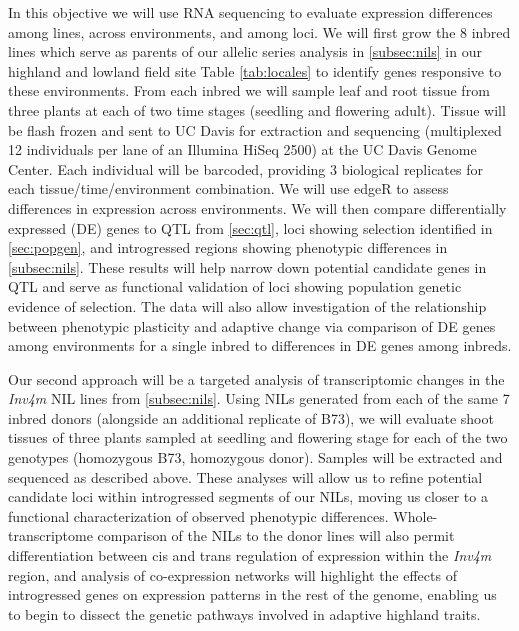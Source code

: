 In this objective we will use RNA sequencing to evaluate expression differences among lines, across environments, and among loci.  We will first grow the 8 inbred lines which serve as parents of our allelic series analysis in \ref{subsec:nils} in our highland and lowland field site Table \ref{tab:locales}  to identify genes responsive to these environments.  From each inbred we will sample leaf and root tissue from three plants at each of two time stages (seedling and flowering adult). Tissue will be flash frozen and sent to UC Davis for extraction and sequencing (multiplexed 12 individuals per lane of an Illumina HiSeq 2500) at the UC Davis Genome Center. Each individual will be barcoded, providing 3 biological replicates for each tissue/time/environment combination. We will use edgeR \citep{robinson2010edger} to assess differences in expression across environments.  We will then compare  differentially expressed (DE) genes to QTL from \ref{sec:qtl}, loci showing selection identified in \ref{sec:popgen}, and introgressed regions showing phenotypic differences in \ref{subsec:nils}.   These results will help narrow down potential candidate genes in QTL and serve as functional validation of loci showing population genetic evidence of selection.  The data will also allow investigation of the relationship between phenotypic plasticity and adaptive change \citep[c.f.][]{Rosas26082013} via comparison of DE genes among environments for a single inbred to differences in DE genes among inbreds.  

Our second approach will be a targeted analysis of transcriptomic changes in the \emph{Inv4m} NIL lines from \ref{subsec:nils}.  Using NILs generated from each of the same 7 inbred donors (alongside an additional replicate of B73), we will evaluate shoot tissues of three plants sampled at seedling and flowering stage for each of the two genotypes (homozygous B73, homozygous donor).  Samples will be extracted and sequenced as described above. These analyses will allow us to refine potential candidate loci within introgressed segments of our NILs, moving us closer to a functional characterization of observed phenotypic differences. Whole-transcriptome comparison of the NILs to the donor lines will also permit differentiation between cis and trans regulation of expression within the \emph{Inv4m}  region, and analysis of co-expression networks \citep[c.f.][]{Swanson-Wagner02072012} will highlight the effects of introgressed genes on expression patterns in the rest of the genome, enabling us to begin to dissect the genetic pathways involved in adaptive highland traits.

